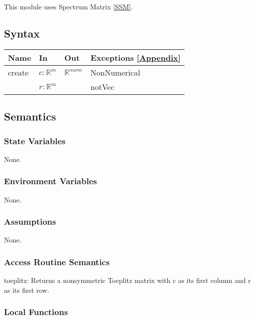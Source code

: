 \documentclass[12pt, titlepage]{article}
\begin{document}
This module uses Spectrum Matrix \ref{SSM}. 

\subsection{Syntax}

\begin{center}
	\begin{tabular}{p{2cm} p{6cm} p{6cm} p{3cm}}
		\hline
		\textbf{Name} & \textbf{In} & \textbf{Out} & \textbf{Exceptions} 
		\ref{Appendix}\\
		\hline
		create & $c : \mathbb{R}^{m}$ & $\mathbb{R}^{mxm}$ & 
		NonNumerical \\
		& $r : \mathbb{R}^{m}$ &  & notVec \\ 
		\hline
	\end{tabular}
\end{center}

\subsection{Semantics}

\subsubsection{State Variables}

None.

\subsubsection{Environment Variables}

None.

\subsubsection{Assumptions}

None.

\subsubsection{Access Routine Semantics}

\noindent toeplitz: Returns a nonsymmetric Toeplitz matrix with c as its first 
column and r as its first row.

\subsubsection{Local Functions} 
\end{document}
